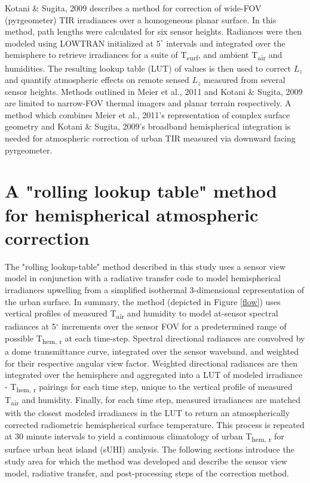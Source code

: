 Kotani \& Sugita, 2009 describes a method for correction of wide-FOV (pyrgeometer) TIR irradiances \cite{Kotani2009a} over a homogeneous planar surface. In this method, path lengths were calculated for six sensor heights. Radiances were then modeled using LOWTRAN initialized at $5^{\circ}$ intervals and integrated over the hemisphere to retrieve irradiances for a suite of T\textsubscript{surf}, and ambient T\textsubscript{air} and humidities. The resulting lookup table (LUT) of values is then used to correct $L_z$ and quantify atmospheric effects on remote sensed $L_z$ measured from several sensor heights. Methods outlined in Meier et al., 2011 and Kotani \& Sugita, 2009 are limited to narrow-FOV thermal imagers and planar terrain respectively. A method which combines Meier et al., 2011's representation of complex surface geometry and Kotani \& Sugita, 2009's broadband hemispherical integration is needed for atmospheric correction of urban TIR measured via downward facing pyrgeometer.

\section{A "rolling lookup table" method for hemispherical atmospheric correction}


The "rolling lookup-table" method described in this study uses a sensor view model in conjunction with a radiative transfer code to model hemispherical irradiances upwelling from a simplified isothermal 3-dimensional representation of the urban surface. In summary, the method (depicted in Figure \ref{flow}) uses vertical profiles of measured T\textsubscript{air} and humidity to model at-sensor spectral radiances at 5$^{\circ}$ increments over the sensor FOV for a predetermined range of possible T\textsubscript{hem, r} at each time-step. Spectral directional radiances are convolved by a dome transmittance curve, integrated over the sensor waveband, and weighted for their respective angular view factor. Weighted directional radiances are then integrated over the hemisphere and aggregated into a LUT of modeled irradiance - T\textsubscript{hem, r} pairings for each time step, unique to the vertical profile of measured T\textsubscript{air} and humidity. Finally, for each time step, measured irradiances are matched with the closest modeled irradiances in the LUT to return an atmospherically corrected radiometric hemispherical surface temperature. This process is repeated at 30 minute intervals to yield a continuous climatology of urban T\textsubscript{hem, r} for surface urban heat island (sUHI) analysis. The following sections introduce the study area for which the method was developed and describe the sensor view model, radiative transfer, and post-processing steps of the correction method.

